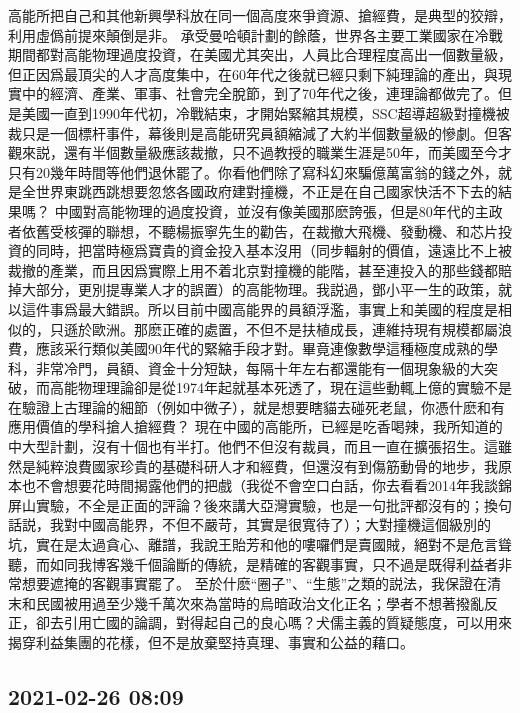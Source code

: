 \documentclass[twocolumn]{ctexart}
\begin{document}
高能所把自己和其他新興學科放在同一個高度來爭資源、搶經費，是典型的狡辯，利用虛僞前提來顛倒是非。
承受曼哈頓計劃的餘蔭，世界各主要工業國家在冷戰期間都對高能物理過度投資，在美國尤其突出，人員比合理程度高出一個數量級，但正因爲最頂尖的人才高度集中，在60年代之後就已經只剩下純理論的產出，與現實中的經濟、產業、軍事、社會完全脫節，到了70年代之後，連理論都做完了。但是美國一直到1990年代初，冷戰結束，才開始緊縮其規模，SSC超導超級對撞機被裁只是一個標杆事件，幕後則是高能研究員額縮減了大約半個數量級的慘劇。但客觀來説，還有半個數量級應該裁撤，只不過教授的職業生涯是50年，而美國至今才只有20幾年時間等他們退休罷了。你看他們除了寫科幻來騙億萬富翁的錢之外，就是全世界東跳西跳想要忽悠各國政府建對撞機，不正是在自己國家快活不下去的結果嗎？
中國對高能物理的過度投資，並沒有像美國那麽誇張，但是80年代的主政者依舊受核彈的聯想，不聽楊振寧先生的勸告，在裁撤大飛機、發動機、和芯片投資的同時，把當時極爲寶貴的資金投入基本沒用（同步輻射的價值，遠遠比不上被裁撤的產業，而且因爲實際上用不着北京對撞機的能階，甚至連投入的那些錢都賠掉大部分，更別提專業人才的誤置）的高能物理。我説過，鄧小平一生的政策，就以這件事爲最大錯誤。所以目前中國高能界的員額浮濫，事實上和美國的程度是相似的，只遜於歐洲。那麽正確的處置，不但不是扶植成長，連維持現有規模都屬浪費，應該采行類似美國90年代的緊縮手段才對。畢竟連像數學這種極度成熟的學科，非常冷門，員額、資金十分短缺，每隔十年左右都還能有一個現象級的大突破，而高能物理理論卻是從1974年起就基本死透了，現在這些動輒上億的實驗不是在驗證上古理論的細節（例如中微子），就是想要瞎貓去碰死老鼠，你憑什麽和有應用價值的學科搶人搶經費？
現在中國的高能所，已經是吃香喝辣，我所知道的中大型計劃，沒有十個也有半打。他們不但沒有裁員，而且一直在擴張招生。這雖然是純粹浪費國家珍貴的基礎科研人才和經費，但還沒有到傷筋動骨的地步，我原本也不會想要花時間揭露他們的把戲（我從不會空口白話，你去看看2014年我談錦屏山實驗，不全是正面的評論？後來講大亞灣實驗，也是一句批評都沒有的；換句話説，我對中國高能界，不但不嚴苛，其實是很寬待了）；大對撞機這個級別的坑，實在是太過貪心、離譜，我說王貽芳和他的嘍囉們是賣國賊，絕對不是危言聳聽，而如同我博客幾千個論斷的傳統，是精確的客觀事實，只不過是既得利益者非常想要遮掩的客觀事實罷了。
至於什麽“圈子”、“生態”之類的説法，我保證在清末和民國被用過至少幾千萬次來為當時的烏暗政治文化正名；學者不想著撥亂反正，卻去引用亡國的論調，對得起自己的良心嗎？犬儒主義的質疑態度，可以用來揭穿利益集團的花樣，但不是放棄堅持真理、事實和公益的藉口。
\subsection*{2021-02-26 08:09}
\end{document}
